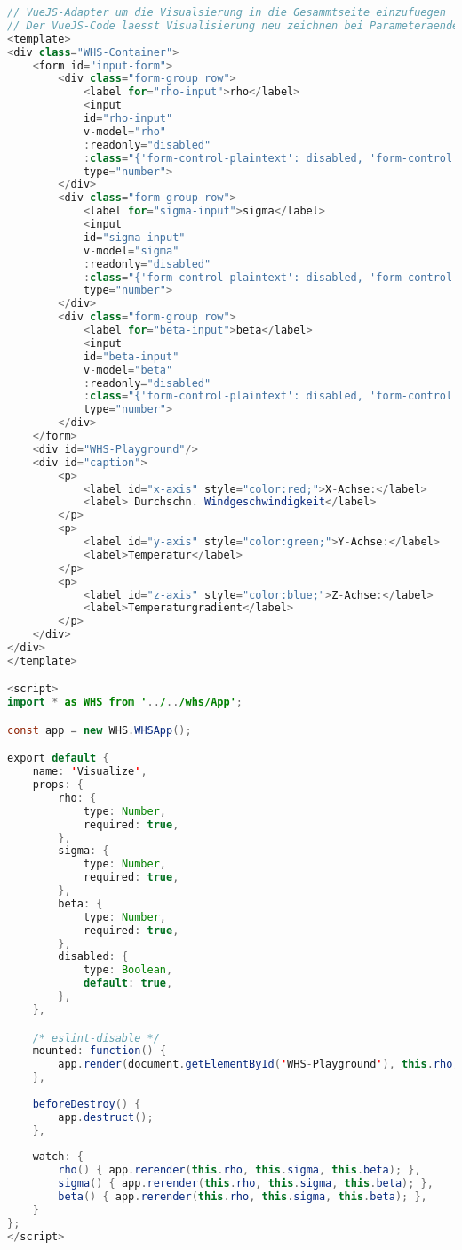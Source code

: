 \begin{lstlisting}[style=C, language=Java, caption=Visualize.vue]
// VueJS-Adapter um die Visualsierung in die Gesammtseite einzufuegen
// Der VueJS-Code laesst Visualisierung neu zeichnen bei Parameteraenderungen
<template>
<div class="WHS-Container">
	<form id="input-form">
		<div class="form-group row">
			<label for="rho-input">rho</label>
			<input
			id="rho-input"
			v-model="rho"
			:readonly="disabled"
			:class="{'form-control-plaintext': disabled, 'form-control': !disabled}"
			type="number">
		</div>
		<div class="form-group row">
			<label for="sigma-input">sigma</label>
			<input
			id="sigma-input"
			v-model="sigma"
			:readonly="disabled"
			:class="{'form-control-plaintext': disabled, 'form-control': !disabled}"
			type="number">
		</div>
		<div class="form-group row">
			<label for="beta-input">beta</label>
			<input
			id="beta-input"
			v-model="beta"
			:readonly="disabled"
			:class="{'form-control-plaintext': disabled, 'form-control': !disabled}"
			type="number">
		</div>
	</form>
	<div id="WHS-Playground"/>
	<div id="caption">
		<p>
			<label id="x-axis" style="color:red;">X-Achse:</label>
			<label> Durchschn. Windgeschwindigkeit</label>
		</p>
		<p>
			<label id="y-axis" style="color:green;">Y-Achse:</label>
			<label>Temperatur</label>
		</p>
		<p>
			<label id="z-axis" style="color:blue;">Z-Achse:</label>
			<label>Temperaturgradient</label>
		</p>
	</div>
</div>
</template>

<script>
import * as WHS from '../../whs/App';

const app = new WHS.WHSApp();

export default {
	name: 'Visualize',
	props: {
		rho: {
			type: Number,
			required: true,
		},
		sigma: {
			type: Number,
			required: true,
		},
		beta: {
			type: Number,
			required: true,
		},
		disabled: {
			type: Boolean,
			default: true,
		},
	},

	/* eslint-disable */
	mounted: function() {
		app.render(document.getElementById('WHS-Playground'), this.rho, this.sigma, this.beta);
	},
	
	beforeDestroy() {
		app.destruct();
	},
	
	watch: {
		rho() { app.rerender(this.rho, this.sigma, this.beta); },
		sigma() { app.rerender(this.rho, this.sigma, this.beta); },
		beta() { app.rerender(this.rho, this.sigma, this.beta); },
	}
};
</script>
\end{lstlisting}